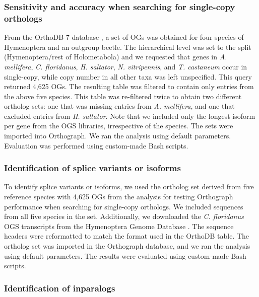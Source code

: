 \subsubsection{Sensitivity and accuracy when searching for single-copy
orthologs}\label{sensitivity-and-accuracy-when-searching-for-single-copy-orthologs}

From the OrthoDB 7 database \citep{Waterhouse2013}, a set of OGs was
obtained for four species of Hymenoptera and an outgroup beetle. The
hierarchical level was set to the split (Hymenoptera/rest of
Holometabola) and we requested that genes in \emph{A. mellifera},
\emph{C. floridanus}, \emph{H. saltator}, \emph{N. vitripennis}, and
\emph{T. castaneum} occur in single-copy, while copy number in all other
taxa was left unspecified. This query returned 4,625 OGs. The resulting
table was filtered to contain only entries from the above five species.
This table was re-filtered twice to obtain two different ortholog sets:
one that was missing entries from \emph{A. mellifera}, and one that
excluded entries from \emph{H. saltator}. Note that we included only the
longest isoform per gene from the OGS libraries, irrespective of the
species. The sets were imported into Orthograph. We ran the analysis
using default parameters. Evaluation was performed using custom-made
Bash scripts.

\subsubsection{Identification of splice variants or
isoforms}\label{identification-of-splice-variants-or-isoforms}

To identify splice variants or isoforms, we used the ortholog set
derived from five reference species with 4,625 OGs from the analysis for
testing Orthograph performance when searching for single-copy orthologs.
We included sequences from all five species in the set. Additionally, we
downloaded the \emph{C. floridanus} OGS transcripts from the Hymenoptera
Genome Database \citep{Munoz-Torres2011}. The sequence headers were
reformatted to match the format used in the OrthoDB table. The ortholog
set was imported in the Orthograph database, and we ran the analysis
using default parameters. The results were evaluated using custom-made
Bash scripts.

\subsubsection{Identification of
inparalogs}\label{identification-of-inparalogs}

